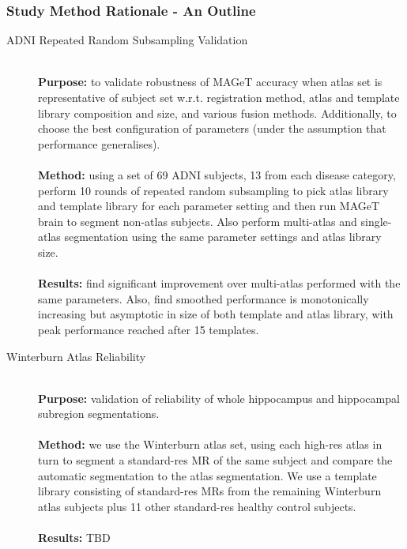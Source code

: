 \documentclass{article}\usepackage{graphicx, color}
\makeatletter
\newenvironment{kframe}{%
 \def\at@end@of@kframe{}%
 \ifinner\ifhmode%
  \def\at@end@of@kframe{\end{minipage}}%
  \begin{minipage}{\columnwidth}%
 \fi\fi%
 \def\FrameCommand##1{\hskip\@totalleftmargin \hskip-\fboxsep
 \colorbox{shadecolor}{##1}\hskip-\fboxsep
     \hskip-\linewidth \hskip-\@totalleftmargin \hskip\columnwidth}%
 \MakeFramed {\advance\hsize-\width
   \@totalleftmargin\z@ \linewidth\hsize
   \@setminipage}}%
 {\par\unskip\endMakeFramed%
 \at@end@of@kframe}
\newcommand{\marginnote}[1]{\-\marginpar[\raggedleft\footnotesize #1]{\raggedright\footnotesize #1}}
\newcommand{\todo}[1]{\marginnote{\textcolor{red}{TODO #1}}}
\makeatother
\begin{document}
\color{fgcolor}\begin{kframe}
\subsubsection{Study Method Rationale - An Outline}
\begin{description}
\item[ADNI Repeated Random Subsampling Validation] \hfill \\ 
{\bf Purpose:} to validate robustness of MAGeT accuracy when atlas set is representative 
of subject set w.r.t. registration method, atlas and template library composition and size, and 
various fusion methods. Additionally, to choose the best configuration of parameters 
(under the assumption that performance generalises). 
\\ \\ 
{\bf Method:} using a set of 69 ADNI subjects, 13 from each disease category, perform 
10 rounds of repeated random subsampling to pick atlas library and template library 
for each parameter setting and then run MAGeT brain to segment non-atlas subjects.
Also perform multi-atlas and single-atlas segmentation using the same parameter settings
and atlas library size.
\\ \\
{\bf Results:} find significant improvement over multi-atlas performed with the same
parameters. Also, find smoothed performance is monotonically increasing but asymptotic
in size of both template and atlas library, with peak performance reached after 15
templates. \todo{Can we statistically capture "peak" performance?  The point at which 
gains become statistically insignificant?}

\item[Winterburn Atlas Reliability] \hfill \\
{\bf Purpose:} validation of reliability of whole hippocampus and hippocampal 
subregion segmentations.
\\ \\
{\bf Method:} we use the Winterburn atlas set, using each high-res atlas in turn 
to segment a standard-res MR of the same subject and compare the automatic 
segmentation to the atlas segmentation.  We use a template library consisting 
of standard-res MRs from the remaining Winterburn atlas subjects plus 11 other 
standard-res healthy control subjects. 
\\ \\
{\bf Results:} TBD 


\end{description}
\end{kframe}
\end{document}
